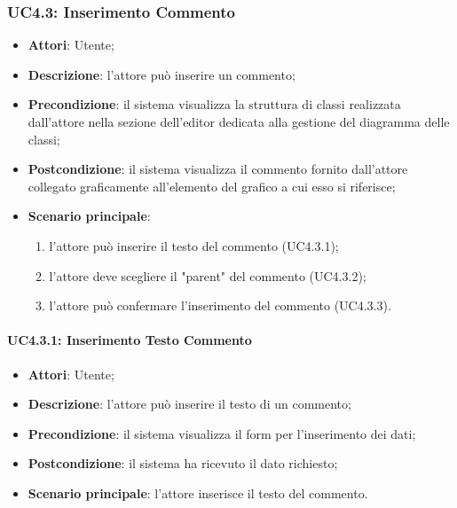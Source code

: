 \subsubsection{UC4.3: Inserimento Commento}
\label{UC4.3}
\begin{itemize}
	\item \textbf{Attori}: Utente;
	\item \textbf{Descrizione}: l'attore può inserire un commento;
	\item \textbf{Precondizione}: il sistema visualizza la struttura di classi realizzata dall'attore nella sezione dell'editor dedicata alla gestione del diagramma delle classi;
	\item \textbf{Postcondizione}: il sistema visualizza il commento fornito dall'attore collegato graficamente all'elemento del grafico a cui esso si riferisce;
	\item \textbf{Scenario principale}:
	\begin{enumerate}
		\item l'attore può inserire il testo del commento (UC4.3.1);
		\item l'attore deve scegliere il "parent" del commento (UC4.3.2);
		\item l'attore può confermare l'inserimento del commento (UC4.3.3).
	\end{enumerate}
\end{itemize}

\paragraph{UC4.3.1: Inserimento Testo Commento}
\label{UC4.3.1}
\begin{itemize}
	\item \textbf{Attori}: Utente;
	\item \textbf{Descrizione}: l'attore può inserire il testo di un commento;
	\item \textbf{Precondizione}: il sistema visualizza il form per l'inserimento dei dati;
	\item \textbf{Postcondizione}: il sistema ha ricevuto il dato richiesto;
	\item \textbf{Scenario principale}: l'attore inserisce il testo del commento.
\end{itemize}

